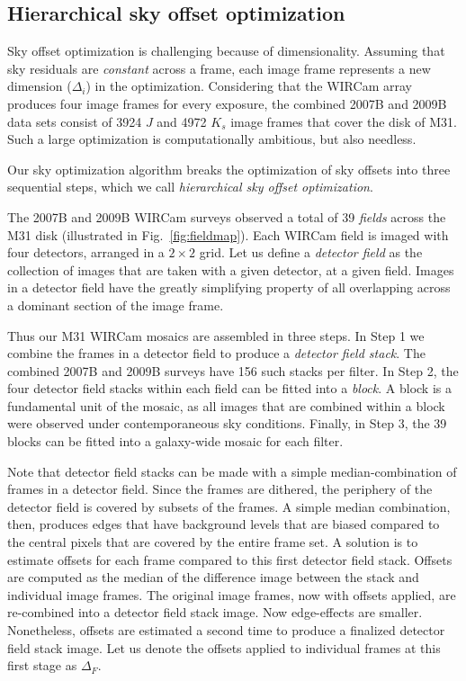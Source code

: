 \documentclass[iop]{emulateapj}
\newcommand{\Fig}[1]{Fig.~\ref{fig:#1}}  %
\begin{document}
\subsection{Hierarchical sky offset optimization}
\label{sec:hierarchical_algo}

Sky offset optimization is challenging because of dimensionality. Assuming that sky residuals are \emph{constant} across a frame, each image frame represents a new dimension ($\Delta_i$) in the optimization. Considering that the WIRCam array produces four image frames for every exposure, the combined 2007B and 2009B data sets consist of 3924 $J$ and 4972 $K_s$ image frames that cover the disk of M31. Such a large optimization is computationally ambitious, but also needless.

Our sky optimization algorithm breaks the optimization of sky offsets into three sequential steps, which we call \emph{hierarchical sky offset optimization}.

The 2007B and 2009B WIRCam surveys observed a total of 39 \emph{fields} across the M31 disk (illustrated in \Fig{fieldmap}).
Each WIRCam field is imaged with four detectors, arranged in a $2\times 2$ grid.
Let us define a \emph{detector field} as the collection of images that are taken with a given detector, at a given field.
Images in a detector field have the greatly simplifying property of all overlapping across a dominant section of the image frame.

Thus our M31 WIRCam mosaics are assembled in three steps.
In Step 1 we combine the frames in a detector field to produce a \emph{detector field stack}.
The combined 2007B and 2009B surveys have 156 such stacks per filter.
In Step 2, the four detector field stacks within each field can be fitted into a \emph{block}.
A block is a fundamental unit of the mosaic, as all images that are combined within a block were observed under contemporaneous sky conditions.
Finally, in Step 3, the 39 blocks can be fitted into a galaxy-wide mosaic for each filter.

Note that detector field stacks can be made with a simple median-combination of frames in a detector field.
Since the frames are dithered, the periphery of the detector field is covered by subsets of the frames.
A simple median combination, then, produces edges that have background levels that are biased compared to the central pixels that are covered by the entire frame set.
A solution is to estimate offsets for each frame compared to this first detector field stack.
Offsets are computed as the median of the difference image between the stack and individual image frames.
The original image frames, now with offsets applied, are re-combined into a detector field stack image.
Now edge-effects are smaller.
Nonetheless, offsets are estimated a second time to produce a finalized detector field stack image.
Let us denote the offsets applied to individual frames at this first stage as $\Delta_F$.
\end{document}
